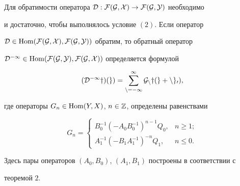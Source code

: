 \begin{thm} 


Для обратимости оператора $\cal D:\cal F(G,X)\to\cal F(G,Y)$ необходимо 


и достаточно, чтобы выполнялось условие $(2)$. Если оператор 


$\cal D\in\operatorname{Hom}(\cal F(G,X),\cal F(G,Y))$ обратим, то обратный оператор 


$\cal D^{-1}\in\operatorname{Hom}(\cal F(G,Y),\cal F(G,X))$ определяется формулой 


\begin{equation} 


(\cal D^{-1}y)(g)=\sum^\infty_{n=-\infty} 


G_n y(g+n g_0), 


\end{equation} 


где операторы $G_n\in\operatorname{Hom}(Y,X)$, $n\in\Bbb Z$, определены равенствами 


$$ 


G_n= 


\begin{cases} 


B^{-1}_0(-A_0B^{-1}_0)^{n-1}Q_0, & n\ge 1;\\ 


A^{-1}_1(-B_1A^{-1}_1)^{-n}Q_1, & n\le0. 


\end{cases} 


$$ 


Здесь пары операторов $(A_0,B_0)$, $(A_1,B_1)$ построены в соответствии с 


теоремой $2$. 


\end{thm} 


 


